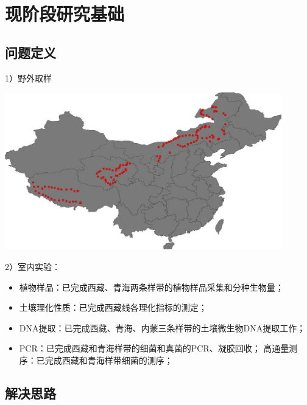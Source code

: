 \section{现阶段研究基础}

\subsection{问题定义}
\begin{frame}{\insertsection}
	1）野外取样
	\begin{center}
		\includegraphics[width = 0.9\textwidth]{./pic/研究方法.jpg}
	\end{center}
\end{frame}
\begin{frame}{\insertsection}{\insertsubsection}	
	2）室内实验：
	\begin{itemize}
		\item 植物样品：已完成西藏、青海两条样带的植物样品采集和分种生物量；
		\item 土壤理化性质：已完成西藏线各理化指标的测定；
		\item DNA提取：已完成西藏、青海、内蒙三条样带的土壤微生物DNA提取工作；
		\item PCR：已完成西藏和青海样带的细菌和真菌的PCR、凝胶回收；
		高通量测序：已完成西藏和青海样带细菌的测序；
	\end{itemize}	
\end{frame}
\subsection{解决思路}
\begin{frame}{\insertsection}{\insertsubsection}
\end{frame}

\begin{frame}{\insertsection}{\insertsubsection}


\end{frame}
